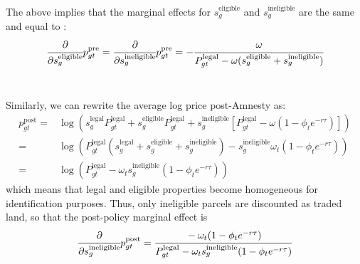 \documentclass[12pt]{article}
\newcommand{\PTR}[1]{{\color{blue}{#1}}}
\begin{document}
\quad The above implies that the marginal effects for $s_g^\text{eligible}$ and $s_g^\text{ineligible}$ are the same and equal to \PTR{change here too (Pot outcome)}:
\begin{equation*}
 \cfrac{\partial }{\partial s_g^\text{eligible}}p_{gt}^\text{pre}= \cfrac{\partial }{\partial s_g^\text{ineligible}}p_{gt}^\text{pre}=-\cfrac{\omega}{P_{gt}^\text{legal}-\omega(s_g^\text{eligible}+s_g^\text{ineligible})}   
\end{equation*}
\ 

\quad Similarly, we can rewrite the average log price post-Amnesty as:
\begin{align*}
 p^\text{post}_{gt}=&\log \left(s^\text{legal}_gP^\text{legal}_{gt}+ s_{g}^{\text{eligible}}P^\text{legal}_{gt}+ s_g^\text{ineligible}[P^{\text{legal}}_{gt}-\omega(1-\phi_t e^{-r\tau})]   \right)    \\
=& \log \left(P_{gt}^\text{legal}(s_g^\text{legal}+s_g^{\text{eligible}}+s_g^\text{ineligible})-s_g^\text{ineligible}\omega_t(1-\phi_t e^{-r\tau})  \right) \\
=&\log \left(P_{gt}^\text{legal}-\omega_ts_g^\text{ineligible}(1-\phi_t e^{-r\tau}) \right)
\end{align*}
which means that legal and eligible properties become homogeneous for identification purposes. Thus, only ineligible parcels are discounted as traded land, so that the post-policy marginal effect is
\begin{equation*}
   \cfrac{\partial }{\partial s_g^\text{ineligible}}p_{gt}^\text{post}=\cfrac{-\omega_t(1-\phi_t e^{-r\tau})}{P_{gt}^{\text{legal}}-\omega_ts_g^\text{ineligible}(1-\phi_t e^{-r\tau})} 
\end{equation*}
\ 
\end{document}
